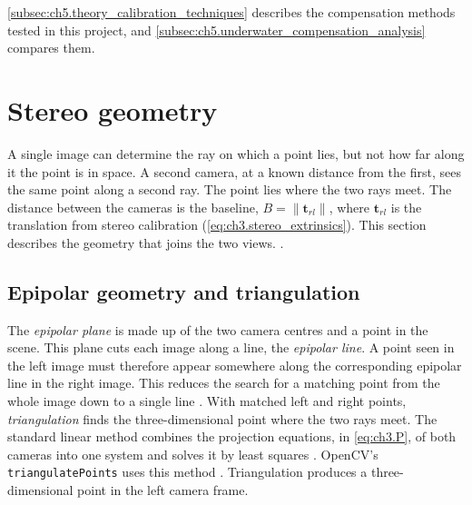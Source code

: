 \autoref{subsec:ch5.theory_calibration_techniques} describes the compensation methods tested in this project, and \autoref{subsec:ch5.underwater_compensation_analysis} compares them.

\section{Stereo geometry}
\label{sec:ch3.stereo_geometry}

A single image can determine the ray on which a point lies, but not how far along it the point is in space.
 A second camera, at a known distance from the first, sees the same point along a second ray. The point lies 
 where the two rays meet. The distance between the cameras is the baseline, $B = \|\mathbf{t}_{rl}\|$,
 where $\mathbf{t}_{rl}$ is the translation from stereo calibration (\autoref{eq:ch3.stereo_extrinsics}). 
 This section describes the geometry that joins the two views.
.
\subsection{Epipolar geometry and triangulation}
\label{subsec:ch3.epipolar}
The \textit{epipolar plane} is made up of the two camera centres and a point in the scene.
 This plane cuts each image along a line, the \textit{epipolar line}.
  A point seen in the left image must therefore appear somewhere along the corresponding epipolar line in the right image.
  This reduces the search for a matching point from the whole image down to a single line \cite{hartleyMultipleViewGeometry2004}. 
 With matched left and right points, \textit{triangulation} finds the three-dimensional point where the two rays meet.
 The standard linear method combines the projection equations, in \autoref{eq:ch3.P}, of both cameras into one 
 system and solves it by least squares \cite{hartleyMultipleViewGeometry2004}. 
 OpenCV's \texttt{triangulatePoints} uses this method \cite{opencvCameraCalibration3DLink}. Triangulation produces a three-dimensional point in the left camera frame.
